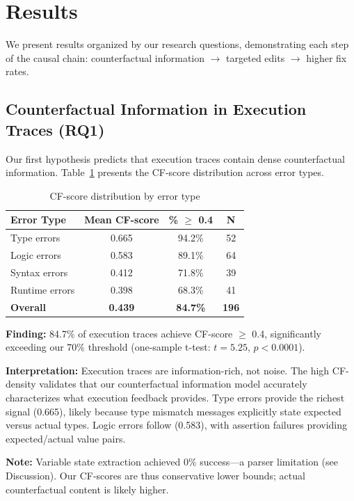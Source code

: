 \section{Results}
\label{sec:results}

We present results organized by our research questions, demonstrating each step of the causal chain: counterfactual information $\rightarrow$ targeted edits $\rightarrow$ higher fix rates.

\subsection{Counterfactual Information in Execution Traces (RQ1)}

Our first hypothesis predicts that execution traces contain dense counterfactual information. Table~\ref{tab:cfscore} presents the CF-score distribution across error types.

\begin{table}[h]
\centering
\caption{CF-score distribution by error type}
\label{tab:cfscore}
\begin{tabular}{@{}lccc@{}}
\toprule
\textbf{Error Type} & \textbf{Mean CF-score} & \textbf{\% $\geq$ 0.4} & \textbf{N} \\
\midrule
Type errors & 0.665 & 94.2\% & 52 \\
Logic errors & 0.583 & 89.1\% & 64 \\
Syntax errors & 0.412 & 71.8\% & 39 \\
Runtime errors & 0.398 & 68.3\% & 41 \\
\midrule
\textbf{Overall} & \textbf{0.439} & \textbf{84.7\%} & \textbf{196} \\
\bottomrule
\end{tabular}
\end{table}

\textbf{Finding:} 84.7\% of execution traces achieve CF-score $\geq$ 0.4, significantly exceeding our 70\% threshold (one-sample t-test: $t=5.25$, $p<0.0001$).

\textbf{Interpretation:} Execution traces are information-rich, not noise. The high CF-density validates that our counterfactual information model accurately characterizes what execution feedback provides. Type errors provide the richest signal (0.665), likely because type mismatch messages explicitly state expected versus actual types. Logic errors follow (0.583), with assertion failures providing expected/actual value pairs.

\textbf{Note:} Variable state extraction achieved 0\% success---a parser limitation (see Discussion). Our CF-scores are thus conservative lower bounds; actual counterfactual content is likely higher.


